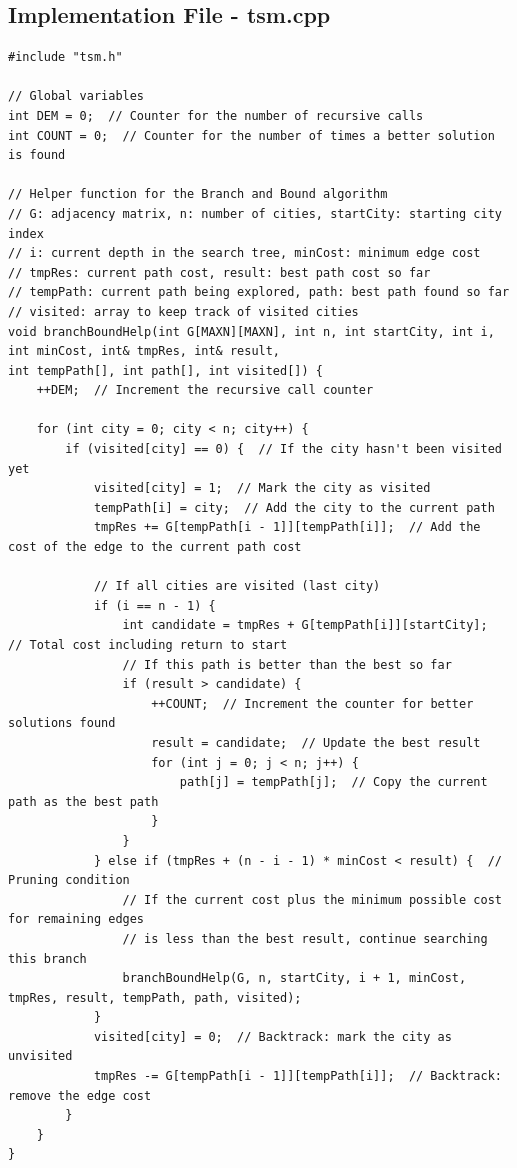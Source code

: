\documentclass[a4paper]{article}
\begin{document}
\subsection{Implementation File - tsm.cpp}
\begin{verbatim}
#include "tsm.h"

// Global variables
int DEM = 0;  // Counter for the number of recursive calls
int COUNT = 0;  // Counter for the number of times a better solution is found

// Helper function for the Branch and Bound algorithm
// G: adjacency matrix, n: number of cities, startCity: starting city index
// i: current depth in the search tree, minCost: minimum edge cost
// tmpRes: current path cost, result: best path cost so far
// tempPath: current path being explored, path: best path found so far
// visited: array to keep track of visited cities
void branchBoundHelp(int G[MAXN][MAXN], int n, int startCity, int i, int minCost, int& tmpRes, int& result, 
int tempPath[], int path[], int visited[]) {
    ++DEM;  // Increment the recursive call counter

    for (int city = 0; city < n; city++) {
        if (visited[city] == 0) {  // If the city hasn't been visited yet
            visited[city] = 1;  // Mark the city as visited
            tempPath[i] = city;  // Add the city to the current path
            tmpRes += G[tempPath[i - 1]][tempPath[i]];  // Add the cost of the edge to the current path cost

            // If all cities are visited (last city)
            if (i == n - 1) {
                int candidate = tmpRes + G[tempPath[i]][startCity];  // Total cost including return to start
                // If this path is better than the best so far
                if (result > candidate) {
                    ++COUNT;  // Increment the counter for better solutions found
                    result = candidate;  // Update the best result
                    for (int j = 0; j < n; j++) {
                        path[j] = tempPath[j];  // Copy the current path as the best path
                    }
                }
            } else if (tmpRes + (n - i - 1) * minCost < result) {  // Pruning condition
                // If the current cost plus the minimum possible cost for remaining edges
                // is less than the best result, continue searching this branch
                branchBoundHelp(G, n, startCity, i + 1, minCost, tmpRes, result, tempPath, path, visited);
            }
            visited[city] = 0;  // Backtrack: mark the city as unvisited
            tmpRes -= G[tempPath[i - 1]][tempPath[i]];  // Backtrack: remove the edge cost
        }
    }
}


\end{verbatim}
\end{document}
